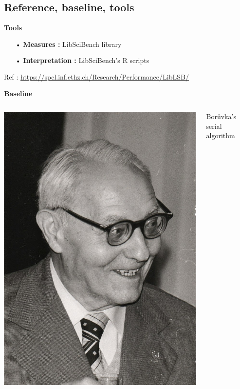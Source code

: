 \documentclass{beamer}
\begin{document}
\subsection{Reference, baseline, tools}
\begin{frame}

\textbf{\Large Tools} 

\begin{itemize}
\item[•] \textbf{Measures :} LibSciBench library
\item[•] \textbf{Interpretation :} LibSciBench's R scripts
\end{itemize}

{
\tiny
Ref : 
\url{https://spcl.inf.ethz.ch/Research/Performance/LibLSB/}
}

\vfill

\textbf{\Large Baseline}

\begin{columns}
\begin{column}{0.3\linewidth}
\begin{center}
\includegraphics[scale=.05]{Boruvka.jpg}
\end{center}
\end{column}
\begin{column}{0.7\linewidth}
\begin{center}
Borůvka's serial algorithm


\end{center}
\end{column}
\end{columns}
\end{frame}
\end{document}
